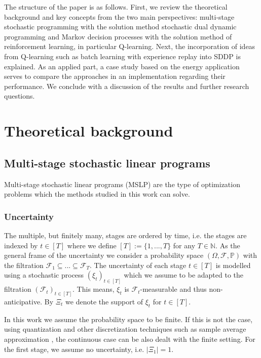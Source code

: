 \documentclass[a4paper,12pt]{article}
\begin{document}
The structure of the paper is as follows. 
First, we review the theoretical background and key concepts from the two main perspectives: multi-stage stochastic programming with the solution method stochastic dual dynamic programming and Markov decision processes with the solution method of reinforcement learning, in particular Q-learning.
Next, the incorporation of ideas from Q-learning such as batch learning with experience replay into SDDP is explained.
As an applied part, a case study based on the energy application serves to compare the approaches in an implementation regarding their performance.
We conclude with a discussion of the results and further research questions.


\section{Theoretical background}

\subsection{Multi-stage stochastic linear programs}
Multi-stage stochastic linear programs (MSLP) are the type of optimization problems which the methods studied in this work can solve.

\subsubsection{Uncertainty}
The multiple, but finitely many, stages are ordered by time, i.e. the stages are indexed by $t \in [T]$ where we define $[T] := \{1,...,T\}$ for any $T\in\mathbb{N}$.
As the general frame of the uncertainty we consider a probability space $(\Omega, \mathcal{F}, \mathbb{P})$ with the filtration $\mathcal{F}_1 \subseteq ... \subseteq \mathcal{F}_T$.
The uncertainty of each stage $t \in [T]$ is modelled using a stochastic process $(\xi_t)_{t\in [T]}$ which we assume to be adapted to the filtration $(\mathcal{F}_t)_{t\in [T]}$. This means, $\xi_t$ is $\mathcal{F}_t$-measurable and thus non-anticipative. By $\Xi_t$ we denote the support of $\xi_t$ for $t\in [T]$.

In this work we assume the probability space to be finite. If this is not the case, using quantization and other discretization techniques such as sample average approximation \cite{shapiro2011analysis}, the continuous case can be also dealt with the finite setting. For the first stage, we assume no uncertainty, i.e. $|\Xi_1| = 1$.
\end{document}

